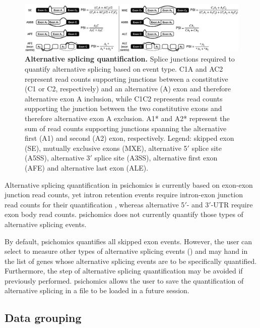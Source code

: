 \begin{figure}[!ht]
  \includegraphics[width=1\textwidth]{images/psichomics/psi-quantification}
  \centering
  \caption[Alternative splicing quantification]{\textbf{Alternative splicing quantification.} Splice junctions required to quantify alternative splicing based on event type. C1A and AC2 represent read counts supporting junctions between a constitutive (C1 or C2, respectively) and an alternative (A) exon and therefore alternative exon A inclusion, while C1C2 represents read counts supporting the junction between the two constitutive exons and therefore alternative exon A exclusion. A1* and A2* represent the sum of read counts supporting junctions spanning the alternative first (A1) and second (A2) exon, respectively. Legend: skipped exon (SE), mutually exclusive exons (MXE), alternative 5$'$ splice site (A5SS), alternative 3$'$ splice site (A3SS), alternative first exon (AFE) and alternative last exon (ALE).}
  \label{fig:psichomics-calc-psi}
\end{figure}

Alternative splicing quantification in psichomics is currently based on exon-exon junction read counts, yet intron retention events require intron-exon junction read counts for their quantification \cite{braunschweig:2014tr}, whereas alternative 5$'$- and 3$'$-UTR require exon body read counts. psichomics does not currently quantify those types of alternative splicing events.

By default, psichomics quantifies all skipped exon events. However, the user can select to measure other types of alternative splicing events () and may hand in the list of genes whose alternative splicing events are to be specifically quantified. Furthermore, the step of alternative splicing quantification may be avoided if previously performed. psichomics allows the user to save the quantification of alternative splicing in a file to be loaded in a future session.

\subsection{Data grouping}

